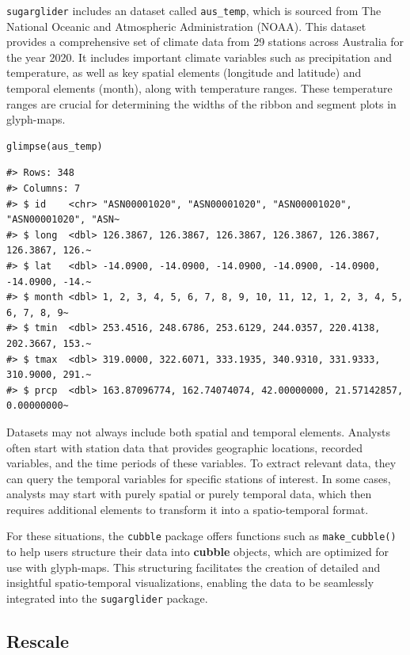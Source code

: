 \texttt{sugarglider} includes an dataset called \texttt{aus\_temp}, which is sourced from The National Oceanic and Atmospheric Administration (NOAA). This dataset provides a comprehensive set of climate data from 29 stations across Australia for the year 2020. It includes important climate variables such as precipitation and temperature, as well as key spatial elements (longitude and latitude) and temporal elements (month), along with temperature ranges. These temperature ranges are crucial for determining the widths of the ribbon and segment plots in glyph-maps.

\begin{verbatim}
glimpse(aus_temp)
\end{verbatim}

\begin{verbatim}
#> Rows: 348
#> Columns: 7
#> $ id    <chr> "ASN00001020", "ASN00001020", "ASN00001020", "ASN00001020", "ASN~
#> $ long  <dbl> 126.3867, 126.3867, 126.3867, 126.3867, 126.3867, 126.3867, 126.~
#> $ lat   <dbl> -14.0900, -14.0900, -14.0900, -14.0900, -14.0900, -14.0900, -14.~
#> $ month <dbl> 1, 2, 3, 4, 5, 6, 7, 8, 9, 10, 11, 12, 1, 2, 3, 4, 5, 6, 7, 8, 9~
#> $ tmin  <dbl> 253.4516, 248.6786, 253.6129, 244.0357, 220.4138, 202.3667, 153.~
#> $ tmax  <dbl> 319.0000, 322.6071, 333.1935, 340.9310, 331.9333, 310.9000, 291.~
#> $ prcp  <dbl> 163.87096774, 162.74074074, 42.00000000, 21.57142857, 0.00000000~
\end{verbatim}

Datasets may not always include both spatial and temporal elements. Analysts often start with station data that provides geographic locations, recorded variables, and the time periods of these variables. To extract relevant data, they can query the temporal variables for specific stations of interest. In some cases, analysts may start with purely spatial or purely temporal data, which then requires additional elements to transform it into a spatio-temporal format.

For these situations, the \texttt{cubble} package offers functions such as \texttt{make\_cubble()} to help users structure their data into \textbf{cubble} objects, which are optimized for use with glyph-maps. This structuring facilitates the creation of detailed and insightful spatio-temporal visualizations, enabling the data to be seamlessly integrated into the \texttt{sugarglider} package.

\subsection{Rescale}\label{rescale}

